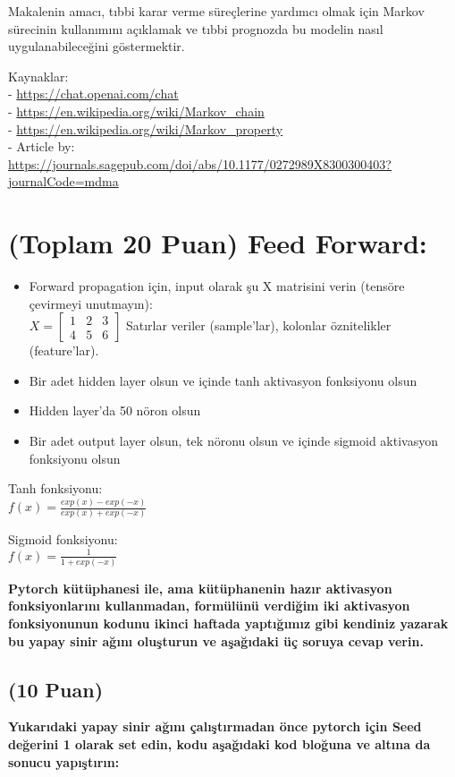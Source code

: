 \documentclass[11pt]{article}
\begin{document}
 Makalenin amacı, tıbbi karar verme süreçlerine yardımcı olmak için Markov sürecinin kullanımını açıklamak ve tıbbi prognozda bu modelin nasıl uygulanabileceğini göstermektir.

 Kaynaklar:
\\ - \url{https://chat.openai.com/chat}
\\ - \url{https://en.wikipedia.org/wiki/Markov_chain}
\\ - \url{https://en.wikipedia.org/wiki/Markov_property}
\\ - Article by: \url{https://journals.sagepub.com/doi/abs/10.1177/0272989X8300300403?journalCode=mdma}
 
\section{(Toplam 20 Puan) Feed Forward:}
 
\begin{itemize}
    \item Forward propagation için, input olarak şu X matrisini verin (tensöre çevirmeyi unutmayın):\\
    $X = \begin{bmatrix}
        1 & 2 & 3\\
        4 & 5 & 6
        \end{bmatrix}$
    Satırlar veriler (sample'lar), kolonlar öznitelikler (feature'lar).
    \item Bir adet hidden layer olsun ve içinde tanh aktivasyon fonksiyonu olsun
    \item Hidden layer'da 50 nöron olsun
    \item Bir adet output layer olsun, tek nöronu olsun ve içinde sigmoid aktivasyon fonksiyonu olsun
\end{itemize}

Tanh fonksiyonu:\\
$f(x) = \frac{exp(x) - exp(-x)}{exp(x) + exp(-x)}$
\vspace{.2in}

Sigmoid fonksiyonu:\\
$f(x) = \frac{1}{1 + exp(-x)}$

\vspace{.2in}
 \textbf{Pytorch kütüphanesi ile, ama kütüphanenin hazır aktivasyon fonksiyonlarını kullanmadan, formülünü verdiğim iki aktivasyon fonksiyonunun kodunu ikinci haftada yaptığımız gibi kendiniz yazarak bu yapay sinir ağını oluşturun ve aşağıdaki üç soruya cevap verin.}
 
\subsection{(10 Puan)} \textbf{Yukarıdaki yapay sinir ağını çalıştırmadan önce pytorch için Seed değerini 1 olarak set edin, kodu aşağıdaki kod bloğuna ve altına da sonucu yapıştırın:}
\end{document}
